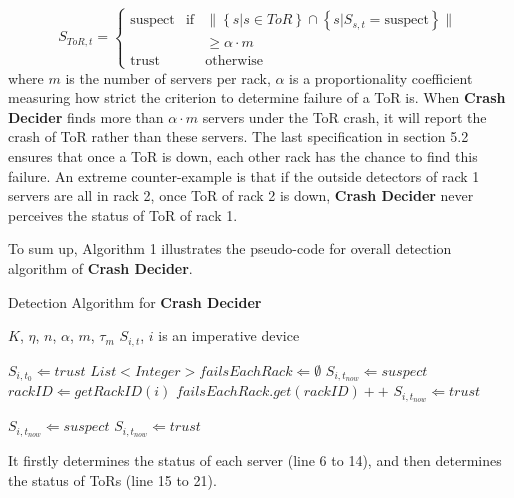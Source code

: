 \documentclass{sig-alternate-05-2015}
\begin{document}
\begin{equation}
S_{ToR,t}=\left\{
    \begin{array}{lcl}
    \text{suspect} & \text{if} & \|\left\{s|s\in ToR\right\} \cap \left\{s|S_{s,t}=\text{suspect}\right\}\| \\
    && \geq \alpha \cdot m\\
    \text{trust} && \text{otherwise}
    \end{array}
\right.
\end{equation}
where $m$ is the number of servers per rack, $\alpha$ is a  proportionality coefficient measuring how strict the criterion to determine failure of a ToR is. When \textbf{Crash Decider} finds more than $\alpha \cdot m$ servers under the ToR crash, it will report the crash of ToR rather than these servers. The last specification in section 5.2 ensures that once a ToR is down, each other rack has the chance to find this failure. An extreme counter-example is that if the outside detectors of rack 1 servers are all in rack 2, once ToR of rack 2 is down, \textbf{Crash Decider} never perceives the status of ToR of rack 1.

To sum up, Algorithm 1 illustrates the pseudo-code for overall detection algorithm of \textbf{Crash Decider}.

\renewcommand{\algorithmicrequire}{\textbf{Input:}}
\renewcommand{\algorithmicensure}{\textbf{Output:}}
\begin{algorithm}
	\caption{Detection Algorithm for \textbf{Crash Decider}}
	\begin{algorithmic}[1]
		\REQUIRE $K$, $\eta$, $n$, $\alpha$, $m$, $\tau_m$
		\ENSURE $S_{i,t}$, $i$ is an imperative device
	
            \STATE $S_{i,t_0} \Leftarrow trust$
        \ENDFOR
            \STATE $List<Integer> failsEachRack \Leftarrow \emptyset$
                    \STATE $S_{i,t_{now}} \Leftarrow suspect$
                    \STATE $rackID \Leftarrow getRackID(i)$
                    \STATE $failsEachRack.get(rackID)++$
                \ELSE
                    \STATE $S_{i,t_{now}} \Leftarrow trust$
                \ENDIF
            \ENDFOR

                    \STATE $S_{i,t_{now}} \Leftarrow suspect$
                \ELSE
                    \STATE $S_{i,t_{now}} \Leftarrow trust$
                \ENDIF
            \ENDFOR
		\ENDWHILE
	\end{algorithmic}
\end{algorithm}
It firstly determines the status of each server (line 6 to 14), and then determines the status of ToRs (line 15 to 21).
\end{document}
